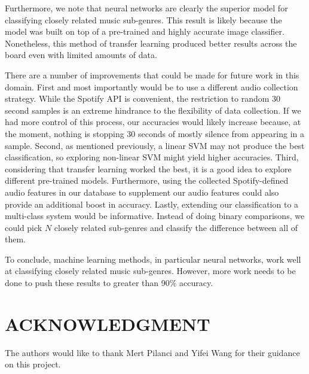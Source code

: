\documentclass[letterpaper, 12 pt, conference]{ieeeconf}  %
\begin{document}
Furthermore, we note that neural networks are clearly the superior model for classifying closely related music sub-genres. This result is likely because the model was built on top of a pre-trained and highly accurate image classifier. Nonetheless, this method of transfer learning produced better results across the board even with limited amounts of data. 

There are a number of improvements that could be made for future work in this domain. First and most importantly would be to use a different audio collection strategy. While the Spotify API is convenient, the restriction to random 30 second samples is an extreme hindrance to the flexibility of data collection. If we had more control of this process, our accuracies would likely increase because, at the moment, nothing is stopping 30 seconds of mostly silence from appearing in a sample. Second, as mentioned previously, a linear SVM may not produce the best classification, so exploring non-linear SVM might yield higher accuracies. Third, considering that transfer learning worked the best, it is a good idea to explore different pre-trained models. Furthermore, using the collected Spotify-defined audio features in our database to supplement our audio features could also provide an additional boost in accuracy. Lastly, extending our classification to a multi-class system would be informative. Instead of doing binary comparisons, we could pick $N$ closely related sub-genres and classify the difference between all of them. 

To conclude, machine learning methods, in particular neural networks, work well at classifying closely related music sub-genres. However, more work needs to be done to push these results to greater than 90\% accuracy. 

\section*{ACKNOWLEDGMENT}

The authors would like to thank Mert Pilanci and Yifei Wang for their guidance on this project.
\end{document}
